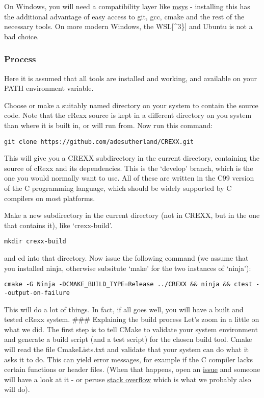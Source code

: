 On Windows, you will need a compatibility layer like
\href{https://www.msys2.org}{msys} - installing this has the additional
advantage of easy access to git, gcc, cmake and the rest of the
necessary tools. On more modern Windows, the WSL{[}\^{}3\}{]} and Ubuntu
is not a bad choice.

\hypertarget{process}{%
\subsubsection{Process}\label{process}}

Here it is assumed that all tools are installed and working, and
available on your PATH environment variable.

Choose or make a suitably named directory on your system to contain the
source code. Note that the cRexx source is kept in a different directory
on you system than where it is built in, or will run from. Now run this
command:

\begin{verbatim}
git clone https://github.com/adesutherland/CREXX.git
\end{verbatim}

This will give you a CREXX subdirectory in the current directory,
containing the source of cRexx and its dependencies. This is the
`develop' branch, which is the one you would normally want to use. All
of these are written in the C99 version of the C programming language,
which should be widely supported by C compilers on most platforms.

Make a new subdirectory in the current directory (not in CREXX, but in
the one that contains it), like `crexx-build'.

\begin{verbatim}
mkdir crexx-build
\end{verbatim}

and cd into that directory. Now issue the following command (we assume
that you installed ninja, otherwise subsitute `make' for the two
instances of `ninja'):

\begin{verbatim}
cmake -G Ninja -DCMAKE_BUILD_TYPE=Release ../CREXX && ninja && ctest --output-on-failure
\end{verbatim}

This will do a lot of things. In fact, if all goes well, you will have a
built and tested cRexx system. \#\#\# Explaining the build process Let's
zoom in a little on what we did. The first step is to tell CMake to
validate your system environment and generate a build script (and a test
script) for the chosen build tool. Cmake will read the file
CmakeLists.txt and validate that your system can do what it asks it to
do. This can yield error messages, for example if the C compiler lacks
certain functions or header files. (When that happens, open an
\href{https://github.com/adesutherland/CREXX/issues}{issue} and someone
will have a look at it - or peruse
\href{https://stackoverflow.com}{stack overflow} which is what we
probably also will do).

